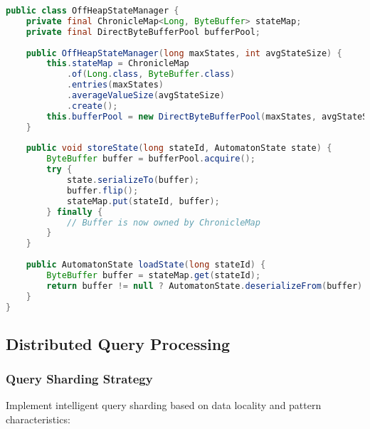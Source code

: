 \documentclass[11pt,a4paper]{article}
\begin{document}
\begin{lstlisting}[language=Java, caption=Off-Heap State Storage]
public class OffHeapStateManager {
    private final ChronicleMap<Long, ByteBuffer> stateMap;
    private final DirectByteBufferPool bufferPool;
    
    public OffHeapStateManager(long maxStates, int avgStateSize) {
        this.stateMap = ChronicleMap
            .of(Long.class, ByteBuffer.class)
            .entries(maxStates)
            .averageValueSize(avgStateSize)
            .create();
        this.bufferPool = new DirectByteBufferPool(maxStates, avgStateSize);
    }
    
    public void storeState(long stateId, AutomatonState state) {
        ByteBuffer buffer = bufferPool.acquire();
        try {
            state.serializeTo(buffer);
            buffer.flip();
            stateMap.put(stateId, buffer);
        } finally {
            // Buffer is now owned by ChronicleMap
        }
    }
    
    public AutomatonState loadState(long stateId) {
        ByteBuffer buffer = stateMap.get(stateId);
        return buffer != null ? AutomatonState.deserializeFrom(buffer) : null;
    }
}
\end{lstlisting}

\subsection{Distributed Query Processing}

\subsubsection{Query Sharding Strategy}

Implement intelligent query sharding based on data locality and pattern characteristics:
\end{document}
